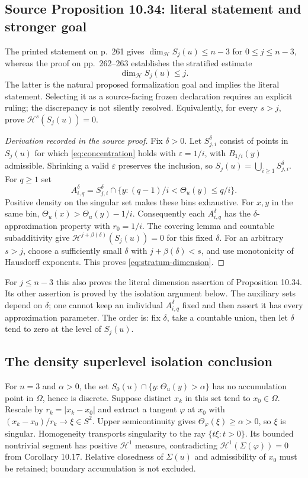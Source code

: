 \documentclass[11pt,a4paper]{article}
\numberwithin{equation}{section}
\theoremstyle{definition}
\theoremstyle{remark}
\newcommand{\HH}{\mathcal H}
\newcommand{\Th}{\Theta}
\newcommand{\dimH}{\operatorname{dim}_{\HH}}
\begin{document}
\subsection{Source Proposition 10.34: literal statement and stronger goal}
\label{prop:stratum-dimension}
The printed statement on p.~261 gives $\dimH S_j(u)\le n-3$ for
$0\le j\le n-3$, whereas the proof on pp.~262--263 establishes the
stratified estimate
\begin{equation}\label{eq:stratum-dimension}
 \dimH S_j(u)\le j.
\end{equation}
The latter is the natural proposed formalization goal and implies the
literal statement. Selecting it as a source-facing frozen declaration
requires an explicit ruling; the discrepancy is not silently resolved.
Equivalently, for every $s>j$, prove $\HH^s(S_j(u))=0$.

\begin{proof}[Derivation recorded in the source proof]
Fix $\delta>0$. Let $S^{\delta}_{j,i}$ consist of points in $S_j(u)$
for which \eqref{eq:concentration} holds with
$\varepsilon=1/i$, with $B_{1/i}(y)$ admissible. Shrinking a valid
$\varepsilon$ preserves the inclusion, so
$S_j(u)=\bigcup_{i\ge1}S^{\delta}_{j,i}$.
For $q\ge1$ set
\[
 A^{\delta}_{i,q}=S^{\delta}_{j,i}\cap
  \{y:(q-1)/i<\Th_u(y)\le q/i\}.
\]
Positive density on the singular set makes these bins exhaustive.
For $x,y$ in the same bin,
$\Th_u(x)>\Th_u(y)-1/i$. Consequently each
$A^{\delta}_{i,q}$ has the $\delta$-approximation property with
$r_0=1/i$. The covering lemma and countable subadditivity give
$\HH^{j+\beta(\delta)}(S_j(u))=0$ for this fixed $\delta$.
For an arbitrary $s>j$, choose a sufficiently small $\delta$ with
$j+\beta(\delta)<s$, and use monotonicity of Hausdorff exponents.
This proves \eqref{eq:stratum-dimension}.
\end{proof}
For $j\le n-3$ this also proves the literal dimension assertion of
Proposition 10.34. Its other assertion is proved by the isolation
argument below.
The auxiliary sets depend on $\delta$; one cannot keep an individual
$A^{\delta}_{i,q}$ fixed and then assert it has every approximation
parameter. The order is: fix $\delta$, take a countable union, then let
$\delta$ tend to zero at the level of $S_j(u)$.

\subsection{The density superlevel isolation conclusion}
\label{prop:isolation}
For $n=3$ and $\alpha>0$, the set
$S_0(u)\cap\{y:\Th_u(y)>\alpha\}$ has no accumulation point in
$\Omega$, hence is discrete. Suppose distinct $x_k$ in this set tend
to $x_0\in\Omega$. Rescale by $r_k=|x_k-x_0|$ and extract a tangent
$\varphi$ at $x_0$ with
$(x_k-x_0)/r_k\to\xi\in S^2$. Upper semicontinuity gives
$\Th_\varphi(\xi)\ge\alpha>0$, so $\xi$ is singular.
Homogeneity transports singularity to the ray
$\{t\xi:t>0\}$. Its bounded nontrivial segment has positive
$\HH^1$ measure, contradicting
$\HH^1(\Sigma(\varphi))=0$ from Corollary 10.17.
Relative closedness of $\Sigma(u)$ and admissibility of $x_0$ must be
retained; boundary accumulation is not excluded.
\end{document}
